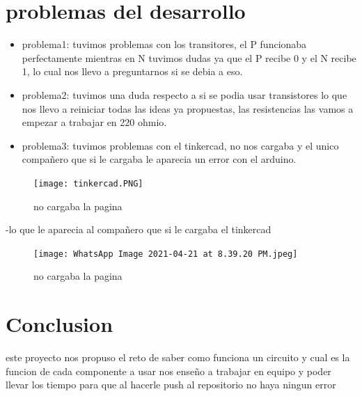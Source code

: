 \documentclass{article}
\begin{document}
\section{problemas del desarrollo}
\begin{itemize}
\item problema1: tuvimos problemas con los transitores, el P funcionaba perfectamente mientras en N tuvimos dudas ya que el P recibe 0 y el N recibe 1, lo cual nos llevo a preguntarnos si se debia a eso.
\item problema2: tuvimos una duda respecto a si se podia usar transistores lo que nos llevo a reiniciar todas las ideas ya propuestas, las resistencias las vamos a empezar a trabajar en 220 ohmio.
\item problema3: tuvimos problemas con el tinkercad, no nos cargaba y el unico compañero que si le cargaba le aparecia un error con el arduino.
\end{itemize}
\begin{figure}[h!]
\centering
\texttt{[image: tinkercad.PNG]}
\caption{no cargaba la pagina}
\label{fig:universe}
\end{figure}
-lo que le aparecia al compañero que si le cargaba el tinkercad
\begin{figure}[h!]
\centering
\texttt{[image: WhatsApp Image 2021-04-21 at 8.39.20 PM.jpeg]}
\caption{no cargaba la pagina}
\label{fig:universe}
\end{figure}
\section{Conclusion}
este proyecto nos propuso el reto de saber como funciona un circuito y cual es la funcion de cada componente a usar
nos enseño a trabajar en equipo y poder llevar los tiempo para que al hacerle push al repositorio no haya ningun error


\end{document}
